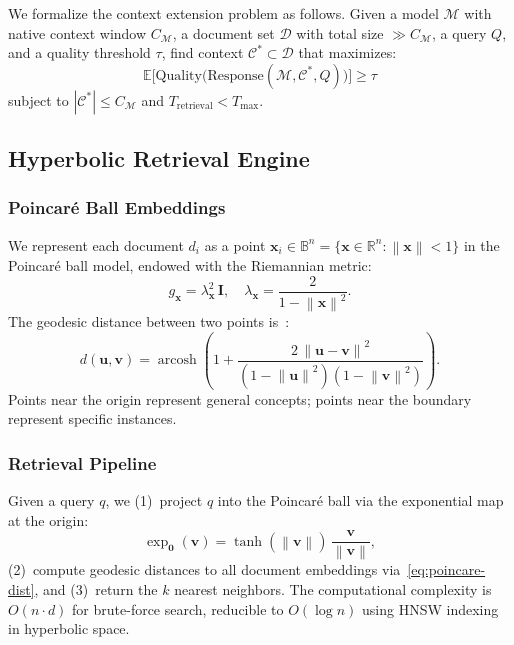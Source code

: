 \documentclass[11pt,a4paper]{article}
\newcommand{\R}{\mathbb{R}}
\newcommand{\B}{\mathbb{B}}
\newcommand{\norm}[1]{\left\|#1\right\|}
\begin{document}
We formalize the context extension problem as follows.
Given a model $\mathcal{M}$ with native context window $C_{\mathcal{M}}$,
a document set $\mathcal{D}$ with total size $\gg C_{\mathcal{M}}$,
a query $Q$, and a quality threshold $\tau$, find context
$\mathcal{C}^{*} \subset \mathcal{D}$ that maximizes:
\begin{equation}
  \mathbb{E}\!\bigl[\mathrm{Quality}\bigl(\mathrm{Response}(\mathcal{M},
    \mathcal{C}^{*}, Q)\bigr)\bigr] \geq \tau
  \label{eq:objective}
\end{equation}
subject to $|\mathcal{C}^{*}| \leq C_{\mathcal{M}}$ and
$T_{\mathrm{retrieval}} < T_{\max}$.

\subsection{Hyperbolic Retrieval Engine}
\label{sec:hyperbolic}

\subsubsection{Poincar\'{e} Ball Embeddings}

We represent each document $d_i$ as a point
$\mathbf{x}_i \in \B^n = \{\mathbf{x} \in \R^n : \norm{\mathbf{x}} < 1\}$
in the Poincar\'{e} ball model, endowed with the Riemannian metric:
\begin{equation}
  g_{\mathbf{x}} = \lambda_{\mathbf{x}}^{2}\,\mathbf{I}, \quad
  \lambda_{\mathbf{x}} = \frac{2}{1 - \norm{\mathbf{x}}^{2}}.
  \label{eq:conformal}
\end{equation}
The geodesic distance between two points
is~\cite{nickel2017poincare}:
\begin{equation}
  d(\mathbf{u}, \mathbf{v}) =
    \operatorname{arcosh}\!\left(
      1 + \frac{2\,\norm{\mathbf{u} - \mathbf{v}}^{2}}
               {(1 - \norm{\mathbf{u}}^{2})(1 - \norm{\mathbf{v}}^{2})}
    \right).
  \label{eq:poincare-dist}
\end{equation}
Points near the origin represent general concepts; points near the
boundary represent specific instances.

\subsubsection{Retrieval Pipeline}

Given a query $q$, we (1)~project $q$ into the Poincar\'{e} ball via the
exponential map at the origin:
\begin{equation}
  \exp_{\mathbf{0}}(\mathbf{v}) =
    \tanh(\norm{\mathbf{v}})\,
    \frac{\mathbf{v}}{\norm{\mathbf{v}}},
  \label{eq:expmap}
\end{equation}
(2)~compute geodesic distances to all document embeddings
via~\eqref{eq:poincare-dist}, and
(3)~return the $k$ nearest neighbors.
The computational complexity is $O(n \cdot d)$ for brute-force search,
reducible to $O(\log n)$ using HNSW indexing in hyperbolic space.
\end{document}
